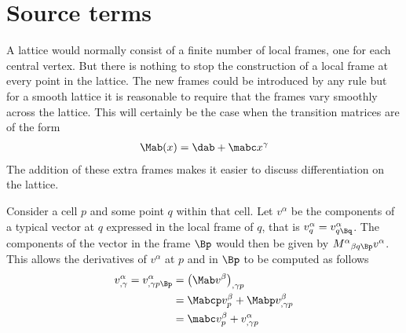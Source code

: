 \documentclass[a4paper,12pt]{article}
\numberwithin{equation}{section}
\begin{document}
\section{Source terms}
\label{sec:SourceTerms}

A lattice would normally consist of a finite number of local frames, one for each central
vertex. But there is nothing to stop the construction of a local frame at every point in the
lattice. The new frames could be introduced by any rule but for a smooth lattice it is
reasonable to require that the frames vary smoothly across the lattice. This will certainly
be the case when the transition matrices are of the form
\begin{align}
   \Mab (x) = \dab + \mabc x^\gamma
\end{align}
The addition of these extra frames makes it easier to discuss differentiation on the lattice.

Consider a cell $p$ and some point $q$ within that cell. Let $v^\alpha$ be the components of
a typical vector at $q$ expressed in the local frame of $q$, that is $v^\alpha_q =
v^\alpha_{q\Bq}$. The components of the vector in the frame $\Bp$ would then be given by
$M^\alpha{}_{\beta q\Bp} v^\alpha$. This allows the derivatives of $v^\alpha$ at $p$ and in
$\Bp$ to be computed as follows
\begin{align}
   v^\alpha_{,\gamma}
   =
   v^\alpha_{,\gamma p\Bp}
   &= \left(\Mab v^\beta\right)_{,\gamma p}\\
   &= \Mabcp v^\beta_p + \Mabp v^\beta_{,\gamma p}\\
   \label{eqn:DerivVa}
   &= \mabc v^\beta_p + v^\alpha_{,\gamma p}
\end{align}
\end{document}
